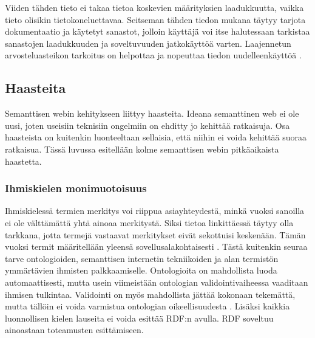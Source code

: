 \documentclass[finnish, 12pt, a4paper, elec, utf8, pdfa, online]{aaltothesis}
\begin{document}
{Viiden tähden tieto ei takaa tietoa koskevien määrityksien laadukkuutta, vaikka tieto olisikin tietokoneluettavaa. Seitseman tähden tiedon mukana täytyy tarjota dokumentaatio ja käytetyt sanastot, jolloin käyttäjä voi itse halutessaan tarkistaa sanastojen laadukkuuden ja soveltuvuuden jatkokäyttöä varten. Laajennetun arvosteluasteikon tarkoitus on helpottaa ja nopeuttaa tiedon uudelleenkäyttöä \cite{SeCo_stars}.


\subsection{Haasteita}
Semanttisen webin kehitykseen liittyy haasteita. Ideana semanttinen web ei ole uusi, joten useisiin teknisiin ongelmiin on ehditty jo kehittää ratkaisuja. Osa haasteista on kuitenkin luonteeltaan sellaisia, että niihin ei voida kehittää suoraa ratkaisua. Tässä luvussa esitellään kolme semanttisen webin pitkäaikaista haastetta.


\subsubsection{Ihmiskielen monimuotoisuus}
Ihmiskielessä termien merkitys voi riippua asiayhteydestä, minkä vuoksi sanoilla ei ole välttämättä yhtä ainoaa merkitystä. Siksi tietoa linkittäessä täytyy olla tarkkana, jotta termejä vastaavat merkitykset eivät sekottuisi keskenään. Tämän vuoksi termit määritellään yleensä sovellusalakohtaisesti \cite{linked_data_finlad}. Tästä kuitenkin seuraa tarve ontologioiden, semanttisen internetin tekniikoiden ja alan termistön ymmärtävien ihmisten palkkaamiselle. Ontologioita on mahdollista luoda automaattisesti, mutta usein viimeistään ontologian validointivaiheessa vaaditaan ihmisen tulkintaa. Validointi on myös mahdollista jättää kokonaan tekemättä, mutta tällöin ei voida varmistua ontologian oikeellisuudesta \cite{automatic_ontology}. Lisäksi kaikkia luonnollisen kielen lauseita ei voida esittää RDF:n avulla. RDF soveltuu ainoastaan toteamusten esittämiseen.

}
\end{document}
